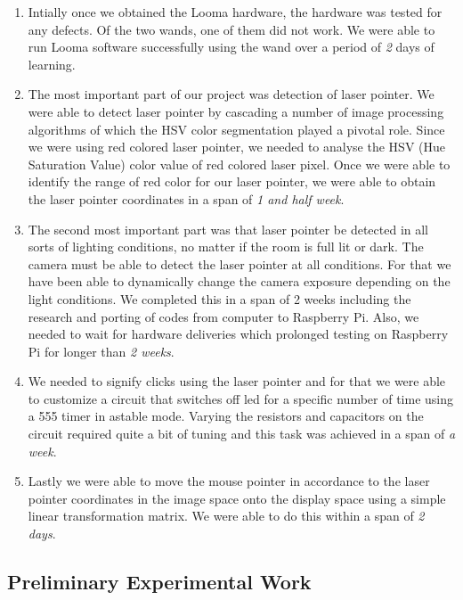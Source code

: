 \documentclass[12pt, a4paper]{article}
\begin{document}
\begin{enumerate}

\item Intially once we obtained the Looma hardware, the hardware was tested for any defects. Of the two wands, one of them did not work. We were able to run Looma software successfully using the wand over a period of \emph { 2 }days of learning. 

\item The most important part of our project was detection of laser pointer. We were able to detect laser pointer by cascading a number of image processing algorithms of which the HSV color segmentation played a pivotal role. Since we were using red colored laser pointer, we needed to analyse the HSV (Hue Saturation Value) color value of red colored laser pixel. Once we were able to identify the range of red color for our laser pointer, we were able to obtain the laser pointer coordinates in a span of \emph {1 and half week}. 

\item The second most important part was that laser pointer be detected in all sorts of lighting conditions, no matter if the room is full lit or dark. The camera must be able to detect the laser pointer at all conditions. For that we have been able to dynamically change the camera exposure depending on the light conditions. We completed this in a span of 2 weeks including the research and porting of codes from computer to Raspberry Pi. Also, we needed to wait for hardware deliveries which prolonged testing on Raspberry Pi for longer than \emph {2 weeks}.  

\item We needed to signify clicks using the laser pointer and for that we were able to customize a circuit that switches off led for a specific number of time using a 555 timer in astable mode. Varying the resistors and capacitors on the circuit required quite a bit of tuning and this task was achieved in a span of \emph {a week}. 

\item Lastly we were able to move the mouse pointer in accordance to the laser pointer coordinates in the image space onto the display space using a simple linear transformation matrix. We were able to do this within a span of \emph { 2 days}.

\end {enumerate}
\subsection{Preliminary Experimental Work}
\end{document}
